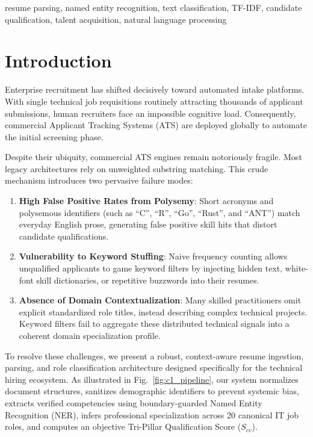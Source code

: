 \documentclass[conference]{IEEEtran}
\begin{document}
\begin{IEEEkeywords}
resume parsing, named entity recognition, text classification, TF-IDF, candidate qualification, talent acquisition, natural language processing
\end{IEEEkeywords}

\section{Introduction}
Enterprise recruitment has shifted decisively toward automated intake platforms. With single technical job requisitions routinely attracting thousands of applicant submissions, human recruiters face an impossible cognitive load. Consequently, commercial Applicant Tracking Systems (ATS) are deployed globally to automate the initial screening phase.

Despite their ubiquity, commercial ATS engines remain notoriously fragile. Most legacy architectures rely on unweighted substring matching. This crude mechanism introduces two pervasive failure modes:
\begin{enumerate}
    \item \textbf{High False Positive Rates from Polysemy}: Short acronyms and polysemous identifiers (such as ``C'', ``R'', ``Go'', ``Rust'', and ``ANT'') match everyday English prose, generating false positive skill hits that distort candidate qualifications.
    \item \textbf{Vulnerability to Keyword Stuffing}: Naive frequency counting allows unqualified applicants to game keyword filters by injecting hidden text, white-font skill dictionaries, or repetitive buzzwords into their resumes.
    \item \textbf{Absence of Domain Contextualization}: Many skilled practitioners omit explicit standardized role titles, instead describing complex technical projects. Keyword filters fail to aggregate these distributed technical signals into a coherent domain specialization profile.
\end{enumerate}

To resolve these challenges, we present a robust, context-aware resume ingestion, parsing, and role classification architecture designed specifically for the technical hiring ecosystem. As illustrated in Fig.~\ref{fig:c1_pipeline}, our system normalizes document structures, sanitizes demographic identifiers to prevent systemic bias, extracts verified competencies using boundary-guarded Named Entity Recognition (NER), infers professional specialization across 20 canonical IT job roles, and computes an objective Tri-Pillar Qualification Score ($S_{cv}$).
\end{document}
